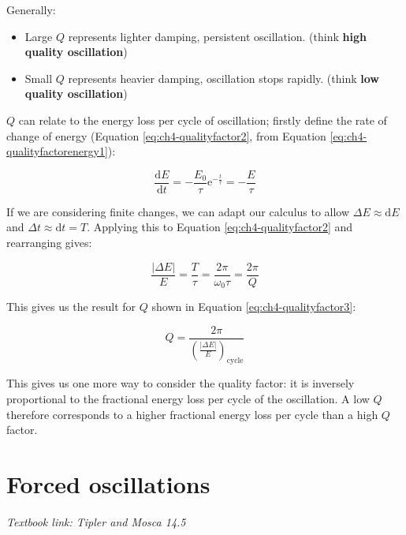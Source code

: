 \documentclass[
]{book}
\providecommand{\tightlist}{%
  \setlength{\itemsep}{0pt}\setlength{\parskip}{0pt}}
\begin{document}
Generally:

\begin{itemize}
\tightlist
\item
  Large \(Q\) represents lighter damping, persistent oscillation. (think \textbf{high quality oscillation})
\item
  Small \(Q\) represents heavier damping, oscillation stops rapidly. (think \textbf{low quality oscillation})
\end{itemize}

\(Q\) can relate to the energy loss per cycle of oscillation; firstly define the rate of change of energy (Equation \eqref{eq:ch4-qualityfactor2}, from Equation \eqref{eq:ch4-qualityfactorenergy1}):

\begin{equation}
\frac{\mathrm{d}E}{\mathrm{d} t} = -\frac{E_0}{\tau} \mathrm{e}^{-\frac{t}{\tau}} = -\frac{E}{\tau}
\label{eq:ch4-qualityfactor2}
\end{equation}

If we are considering finite changes, we can adapt our calculus to allow \(\Delta E \approx \mathrm{d}E\) and \(\Delta t \approx \mathrm{d}t = T\). Applying this to Equation \eqref{eq:ch4-qualityfactor2} and rearranging gives:

\begin{equation}
\frac{|\Delta E|}{E} = \frac{T}{\tau} = \frac{2 \pi}{\omega_0 \tau} = \frac{2 \pi}{Q}
\end{equation}

This gives us the result for \(Q\) shown in Equation \eqref{eq:ch4-qualityfactor3}:

\begin{equation}
Q = \frac{2 \pi}{\left( \frac{|\Delta E|}{E} \right)_{\mathrm{cycle}}}
\label{eq:ch4-qualityfactor3}
\end{equation}

This gives us one more way to consider the quality factor: it is inversely proportional to the fractional energy loss per cycle of the oscillation. A low \(Q\) therefore corresponds to a higher fractional energy loss per cycle than a high \(Q\) factor.

\hypertarget{sec:ch5-forcedoscillations}{%
\chapter{Forced oscillations}\label{sec:ch5-forcedoscillations}}

\emph{Textbook link: Tipler and Mosca 14.5}
\end{document}
